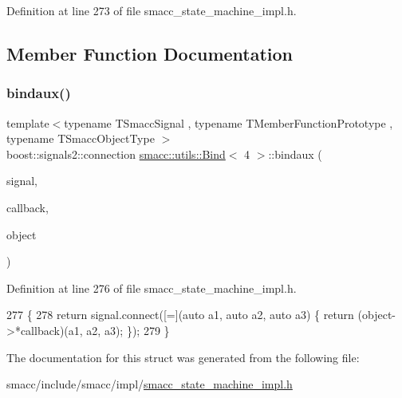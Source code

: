 Definition at line 273 of file smacc\+\_\+state\+\_\+machine\+\_\+impl.\+h.



\subsection{Member Function Documentation}
\mbox{\label{structsmacc_1_1utils_1_1Bind_3_014_01_4_af999b2ea156fad369be761be47f83f18}} 
\subsubsection{\texorpdfstring{bindaux()}{bindaux()}}
{\footnotesize\ttfamily template$<$typename T\+Smacc\+Signal , typename T\+Member\+Function\+Prototype , typename T\+Smacc\+Object\+Type $>$ \\
boost\+::signals2\+::connection \hyperlink{structsmacc_1_1utils_1_1Bind}{smacc\+::utils\+::\+Bind}$<$ 4 $>$\+::bindaux (\begin{DoxyParamCaption}\item[{T\+Smacc\+Signal \&}]{signal,  }\item[{T\+Member\+Function\+Prototype}]{callback,  }\item[{T\+Smacc\+Object\+Type $\ast$}]{object }\end{DoxyParamCaption})\hspace{0.3cm}{\ttfamily [inline]}}



Definition at line 276 of file smacc\+\_\+state\+\_\+machine\+\_\+impl.\+h.


\begin{DoxyCode}
277     \{
278         \textcolor{keywordflow}{return} signal.connect([=](\textcolor{keyword}{auto} a1, \textcolor{keyword}{auto} a2, \textcolor{keyword}{auto} a3) \{ \textcolor{keywordflow}{return} (object->*callback)(a1, a2, a3); \});
279     \}
\end{DoxyCode}


The documentation for this struct was generated from the following file\+:\begin{DoxyCompactItemize}
\item 
smacc/include/smacc/impl/\hyperlink{smacc__state__machine__impl_8h}{smacc\+\_\+state\+\_\+machine\+\_\+impl.\+h}\end{DoxyCompactItemize}
